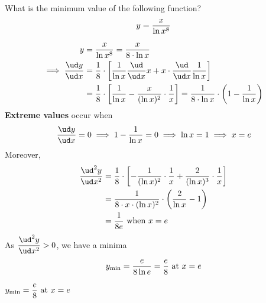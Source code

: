 

\question[3] What is the minimum value of the following function? 
\[ y = \dfrac{x}{\ln x^8 } \]

\watchout

\begin{solution}[\fullpage]
	\begin{align}
	   y &= \dfrac{x}{\ln x^\va} = \dfrac{x}{\va\cdot\ln x} \\
	   \implies \dfrac{\ud y}{\ud x} &= 
      \dfrac{1}\va\cdot\left[ \dfrac{1}{\ln x}\dfrac{\ud}{\ud x}x + 
      x\cdot\dfrac{\ud}{\ud x}\dfrac{1}{\ln x} \right] \\
      &= \dfrac{1}\va\cdot\left[ \dfrac{1}{\ln x} - \dfrac{x}{(\ln x)^2}\cdot\dfrac{1}{x} \right]
      = \dfrac{1}{\va\cdot\ln x}\cdot\left( 1 - \dfrac{1}{\ln x} \right) 
	\end{align}
  \textbf{Extreme values} occur when 
  \[ \dfrac{\ud y}{\ud x} = 0 \implies 1-\dfrac{1}{\ln x} = 0 \implies \ln x = 1\implies x = e \] 
  Moreover, 
  \begin{align}
    \dfrac{\ud^2 y}{\ud x^2} &= \dfrac{1}\va\cdot
    \left[ -\dfrac{1}{(\ln x)^2}\cdot\dfrac{1}{x} + \dfrac{2}{(\ln x)^3}\cdot\dfrac{1}{x} \right] \\
    &= \dfrac{1}{\va\cdot x\cdot (\ln x)^2}\cdot\left( \dfrac{2}{\ln x} - 1 \right)  \\
    &= \dfrac{1}{\va e}\text{ when } x = e 
  \end{align}
  As $\dfrac{\ud^2 y}{\ud x^2} > 0$, we have a minima 
  \[ y_{\text{min}} = \dfrac{e}{8\ln e} = \dfrac{e}{8}\text{ at } x = e \]
\end{solution}

\ifprintanswers
  \begin{codex}
    $y_{\text{min}} = \dfrac{e}{8}\text{ at } x = e$
  \end{codex}
\fi
